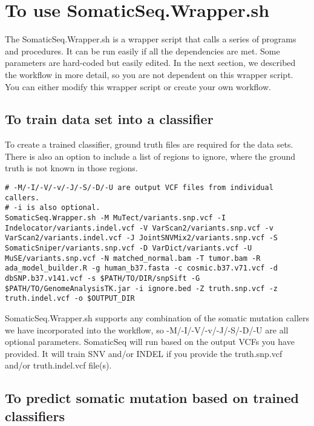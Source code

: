 \documentclass[10pt,letterpaper]{article}
\begin{document}
\begin{sloppypar}
\begin{itemize}
\end{itemize}



\section{To use SomaticSeq.Wrapper.sh}

The SomaticSeq.Wrapper.sh is a wrapper script that calls a series of programs and procedures. It can be run easily if all the dependencies are met. Some parameters are hard-coded but easily edited. In the next section, we described the workflow in more detail, so you are not dependent on this wrapper script. You can either modify this wrapper script or create your own workflow. 


\subsection{To train data set into a classifier}

To create a trained classifier, ground truth files are required for the data sets. There is also an option to include a list of regions to ignore, where the ground truth is not known in those regions. 

\begin{lstlisting}
# -M/-I/-V/-v/-J/-S/-D/-U are output VCF files from individual callers.
# -i is also optional.
SomaticSeq.Wrapper.sh -M MuTect/variants.snp.vcf -I Indelocator/variants.indel.vcf -V VarScan2/variants.snp.vcf -v VarScan2/variants.indel.vcf -J JointSNVMix2/variants.snp.vcf -S SomaticSniper/variants.snp.vcf -D VarDict/variants.vcf -U MuSE/variants.snp.vcf -N matched_normal.bam -T tumor.bam -R ada_model_builder.R -g human_b37.fasta -c cosmic.b37.v71.vcf -d dbSNP.b37.v141.vcf -s $PATH/TO/DIR/snpSift -G $PATH/TO/GenomeAnalysisTK.jar -i ignore.bed -Z truth.snp.vcf -z truth.indel.vcf -o $OUTPUT_DIR
\end{lstlisting}

SomaticSeq.Wrapper.sh supports any combination of the somatic mutation callers we have incorporated into the workflow, so -M/-I/-V/-v/-J/-S/-D/-U are all optional parameters. SomaticSeq will run based on the output VCFs you have provided. It will train SNV and/or INDEL if you provide the truth.snp.vcf and/or truth.indel.vcf file(s).




\subsection{To predict somatic mutation based on trained classifiers}


\end{sloppypar}
\end{document}

